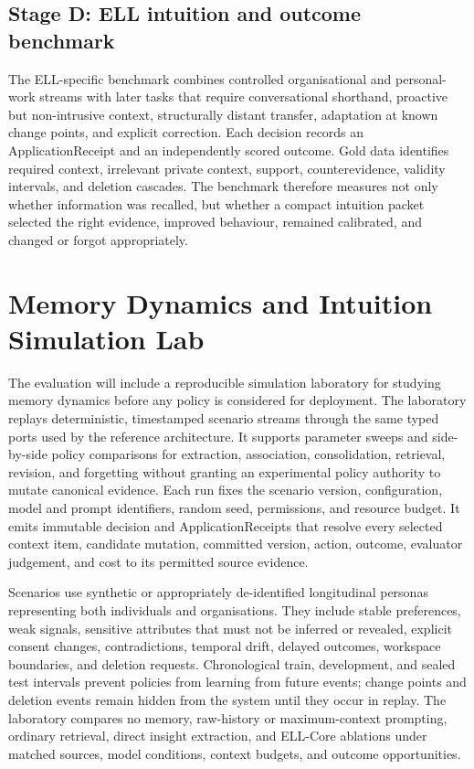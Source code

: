 \documentclass[
  english,
  a4paper,
  DIV=11,
  numbers=noendperiod]{scrreprt}
\begin{document}
\subsection{Stage D: ELL intuition and outcome
benchmark}\label{stage-d-ell-intuition-and-outcome-benchmark}

The ELL-specific benchmark combines controlled organisational and
personal-work streams with later tasks that require conversational
shorthand, proactive but non-intrusive context, structurally distant
transfer, adaptation at known change points, and explicit correction.
Each decision records an ApplicationReceipt and an independently scored
outcome. Gold data identifies required context, irrelevant private
context, support, counterevidence, validity intervals, and deletion
cascades. The benchmark therefore measures not only whether information
was recalled, but whether a compact intuition packet selected the right
evidence, improved behaviour, remained calibrated, and changed or forgot
appropriately.

\section{Memory Dynamics and Intuition Simulation
Lab}\label{memory-dynamics-and-intuition-simulation-lab}

The evaluation will include a reproducible simulation laboratory for
studying memory dynamics before any policy is considered for deployment.
The laboratory replays deterministic, timestamped scenario streams
through the same typed ports used by the reference architecture. It
supports parameter sweeps and side-by-side policy comparisons for
extraction, association, consolidation, retrieval, revision, and
forgetting without granting an experimental policy authority to mutate
canonical evidence. Each run fixes the scenario version, configuration,
model and prompt identifiers, random seed, permissions, and resource
budget. It emits immutable decision and ApplicationReceipts that resolve
every selected context item, candidate mutation, committed version,
action, outcome, evaluator judgement, and cost to its permitted source
evidence.

Scenarios use synthetic or appropriately de-identified longitudinal
personas representing both individuals and organisations. They include
stable preferences, weak signals, sensitive attributes that must not be
inferred or revealed, explicit consent changes, contradictions, temporal
drift, delayed outcomes, workspace boundaries, and deletion requests.
Chronological train, development, and sealed test intervals prevent
policies from learning from future events; change points and deletion
events remain hidden from the system until they occur in replay. The
laboratory compares no memory, raw-history or maximum-context prompting,
ordinary retrieval, direct insight extraction, and ELL-Core ablations
under matched sources, model conditions, context budgets, and outcome
opportunities.
\end{document}
